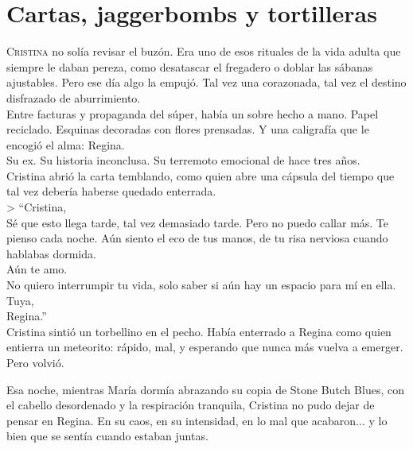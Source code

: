 \setlength{\parindent}{0pt}

\chapter{Cartas, jaggerbombs y tortilleras}


\lettrine[loversize=0.2, lines=2]{C}{ristina} no solía revisar el buzón. Era uno de esos rituales de la vida adulta que siempre le daban pereza, como desatascar el fregadero o doblar las sábanas ajustables. Pero ese día algo la empujó. Tal vez una corazonada, tal vez el destino disfrazado de aburrimiento.\\

Entre facturas y propaganda del súper, había un sobre hecho a mano. Papel reciclado. Esquinas decoradas con flores prensadas. Y una caligrafía que le encogió el alma: Regina.\\

Su ex. Su historia inconclusa. Su terremoto emocional de hace tres años.\\

Cristina abrió la carta temblando, como quien abre una cápsula del tiempo que tal vez debería haberse quedado enterrada.\\

> “Cristina,\\

Sé que esto llega tarde, tal vez demasiado tarde. Pero no puedo callar más. Te pienso cada noche. Aún siento el eco de tus manos, de tu risa nerviosa cuando hablabas dormida.\\

Aún te amo.\\

No quiero interrumpir tu vida, solo saber si aún hay un espacio para mí en ella.\\

Tuya,\\
Regina.”\\


Cristina sintió un torbellino en el pecho. Había enterrado a Regina como quien entierra un meteorito: rápido, mal, y esperando que nunca más vuelva a emerger. Pero volvió.\\

\saltescena

Esa noche, mientras María dormía abrazando su copia de Stone Butch Blues, con el cabello desordenado y la respiración tranquila, Cristina no pudo dejar de pensar en Regina. En su caos, en su intensidad, en lo mal que acabaron... y lo bien que se sentía cuando estaban juntas.\\

